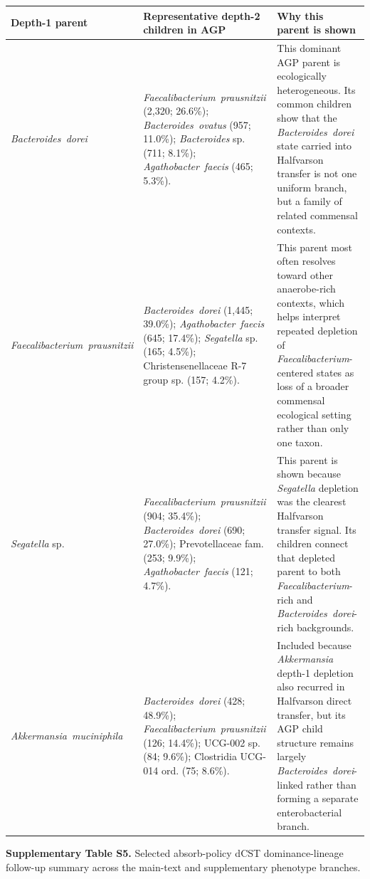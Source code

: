 \documentclass[11pt]{article}
\newcommand{\taxon}[1]{\emph{#1}}
\begin{document}
\begin{center}
\scriptsize
\begin{tabularx}{\textwidth}{@{} l Y Y @{}}
\toprule
Depth-1 parent & Representative depth-2 children in AGP & Why this parent is shown \\
\midrule
\taxon{Bacteroides~dorei} &
\taxon{Faecalibacterium~prausnitzii} (2,320; 26.6\%); \taxon{Bacteroides~ovatus} (957; 11.0\%); \taxon{Bacteroides} sp. (711; 8.1\%); \taxon{Agathobacter~faecis} (465; 5.3\%). &
This dominant AGP parent is ecologically heterogeneous. Its common children show that the \taxon{Bacteroides~dorei} state carried into Halfvarson transfer is not one uniform branch, but a family of related commensal contexts. \\
\taxon{Faecalibacterium~prausnitzii} &
\taxon{Bacteroides~dorei} (1,445; 39.0\%); \taxon{Agathobacter~faecis} (645; 17.4\%); \taxon{Segatella} sp. (165; 4.5\%); Christensenellaceae R-7 group sp. (157; 4.2\%). &
This parent most often resolves toward other anaerobe-rich contexts, which helps interpret repeated depletion of \taxon{Faecalibacterium}-centered states as loss of a broader commensal ecological setting rather than only one taxon. \\
\taxon{Segatella} sp. &
\taxon{Faecalibacterium~prausnitzii} (904; 35.4\%); \taxon{Bacteroides~dorei} (690; 27.0\%); Prevotellaceae fam. (253; 9.9\%); \taxon{Agathobacter~faecis} (121; 4.7\%). &
This parent is shown because \taxon{Segatella} depletion was the clearest Halfvarson transfer signal. Its children connect that depleted parent to both \taxon{Faecalibacterium}-rich and \taxon{Bacteroides~dorei}-rich backgrounds. \\
\taxon{Akkermansia~muciniphila} &
\taxon{Bacteroides~dorei} (428; 48.9\%); \taxon{Faecalibacterium~prausnitzii} (126; 14.4\%); UCG-002 sp. (84; 9.6\%); Clostridia UCG-014 ord. (75; 8.6\%). &
Included because \taxon{Akkermansia} depth-1 depletion also recurred in Halfvarson direct transfer, but its AGP child structure remains largely \taxon{Bacteroides~dorei}-linked rather than forming a separate enterobacterial branch. \\
\bottomrule
\end{tabularx}
\end{center}

\bigskip

\noindent\textbf{Supplementary Table S5.} Selected absorb-policy dCST
dominance-lineage follow-up summary across the main-text and
supplementary phenotype branches.
\end{document}
